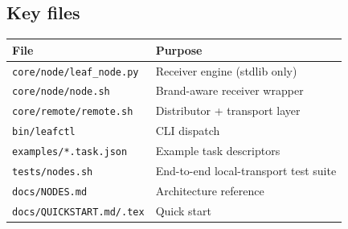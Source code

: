\documentclass[11pt,a4paper]{article}
\begin{document}
\subsection*{Key files}

\begin{tabular}{@{}ll@{}}
\toprule
File & Purpose \\
\midrule
\texttt{core/node/leaf\_node.py}  & Receiver engine (stdlib only) \\
\texttt{core/node/node.sh}        & Brand-aware receiver wrapper \\
\texttt{core/remote/remote.sh}    & Distributor + transport layer \\
\texttt{bin/leafctl}              & CLI dispatch \\
\texttt{examples/*.task.json}     & Example task descriptors \\
\texttt{tests/nodes.sh}           & End-to-end local-transport test suite \\
\texttt{docs/NODES.md}            & Architecture reference \\
\texttt{docs/QUICKSTART.md/.tex}  & Quick start \\
\bottomrule
\end{tabular}
\end{document}
